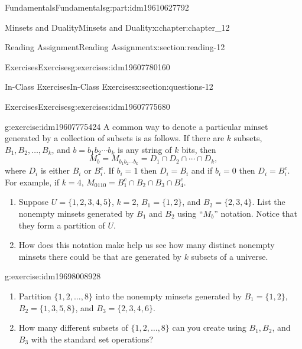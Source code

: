 \documentclass[oneside,10pt,]{book}
\numberwithin{equation}{section}
\begin{document}
\begin{partptx}{Fundamentals}{}{Fundamentals}{}{}{g:part:idm19610627792}
\begin{chapterptx}{Minsets and Duality}{}{Minsets and Duality}{}{}{x:chapter:chapter_12}
\begin{sectionptx}{Reading Assignment}{}{Reading Assignment}{}{}{x:section:reading-12}
\begin{exercises-subsection-numberless}{Exercises}{}{Exercises}{}{}{g:exercises:idm19607780160}
\end{exercises-subsection-numberless}
\end{sectionptx}
%
%
\typeout{************************************************}
\typeout{************************************************}
%
\begin{sectionptx}{In-Class Exercises}{}{In-Class Exercises}{}{}{x:section:questions-12}
%
%
%
\typeout{************************************************}
\typeout{************************************************}
%
\begin{exercises-subsection-numberless}{Exercises}{}{Exercises}{}{}{g:exercises:idm19607775680}
\par\medskip\noindent%
%
\begin{exercisegroup}
\begin{divisionexerciseeg}{1}{}{}{g:exercise:idm19607775424}%
A common way to denote a particular minset generated by a collection of subsets is as follows.  If there are \(k\) subsets, \(B_1, B_2, \dots ,B_k\), and \(b=b_1b_2\cdots b_k\) is any string of \(k\) bits, then%
\begin{equation*}
M_b =  M_{b_1b_2\cdots b_k} = D_1 \cap D_2 \cap \cdots \cap D_k,
\end{equation*}
where \(D_i\) is either \(B_i\) or \(B_i^c\).  If \(b_i = 1\) then \(D_i =B_i\) and if \(b_i=0\) then \(D_i=B_i^c\).  For example, if \(k=4\), \(M_{0110} = B_1^c \cap B_2 \cap B_3 \cap B_4^c\).%
\begin{enumerate}[label=(\alph*)]
\item{}Suppose \(U=\{1, 2, 3, 4, 5\}\), \(k=2\), \(B_1= \{1, 2\}\), and \(B_2 = \{2,3,4\}\).  List the nonempty minsets generated by \(B_1\) and \(B_2\) using ``\(M_b\)'' notation. Notice that they form a partition of \(U\).%
\item{}How does this notation make help us see how many distinct nonempty minsets there could be that are generated by \(k\) subsets of a universe.%
\end{enumerate}
%
\end{divisionexerciseeg}%
\begin{divisionexerciseeg}{2}{}{}{g:exercise:idm19698008928}%
%
\begin{enumerate}[label=(\alph*)]
\item{}Partition \(\{1, 2,  \dots, 8\}\) into the nonempty minsets generated by \(B_1= \{1, 2\}\), \(B_2 = \{1, 3, 5, 8\}\), and \(B_3 = \{2, 3, 4, 6\}\).%
\item{}How many different subsets of \(\{1, 2, \dots ,8\}\) can you create using \(B_1, B_2\), and \(B_3\) with the standard set operations?%

\end{enumerate}
\end{divisionexerciseeg}
\end{exercisegroup}
\end{exercises-subsection-numberless}
\end{sectionptx}
\end{chapterptx}
\end{partptx}
\end{document}
